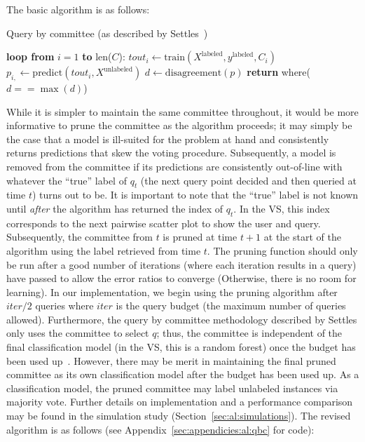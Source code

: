 The basic algorithm is as follows:

\tablespacing
\begin{algorithm}[H]
	\caption{Query by committee (as described by 
	Settles~\cite{settles2010})}\label{alg:al:methods:qbc1}
	\begin{algorithmic}[1]
		\State \textbf{loop from} $i=1$ \textbf{to} len($C$):
		\State \indent $\textit{tout}_{i} \gets 
		\text{train}(X^{\text{labeled}},y^{\text{labeled}},C_i)$
		\State \indent $p_{i,} \gets 
		\text{predict}(\textit{tout}_i,X^{\text{unlabeled}})$
		\State $d \gets \text{disagreement}(p)$
		\State \textbf{return} where($d==\max{(d)}$)
		\EndProcedure
	\end{algorithmic}
\end{algorithm}
\bodyspacing

\noindent While it is simpler to maintain the same committee 
throughout, it would be more informative to prune the committee as the 
algorithm proceeds; it may simply be the case that a model is ill-suited for 
the problem at hand and consistently returns predictions that skew the voting 
procedure. Subsequently, a model is removed from the committee if its 
predictions are consistently out-of-line with whatever the ``true'' label of 
$q_t$ (the next query point decided and then queried at time $t$) turns out to 
be. It is important to note that the ``true'' label is not known until 
\textit{after} the algorithm has returned the index of $q_t$. In the VS, this 
index corresponds to the next pairwise scatter plot to show the 
user and query. Subsequently, the committee from $t$ 
is pruned at time $t+1$ at the start of the algorithm using the label retrieved 
from time $t$. The pruning function should only 
be run after a good number of iterations (where each iteration results in a 
query) have passed to allow the error ratios to converge (Otherwise, there is 
no room for learning). In our implementation, we begin using the pruning 
algorithm after $iter/2$ queries where $iter$ is the query budget (the maximum 
number of queries allowed).
Furthermore, the query by committee methodology described by Settles only uses 
the committee to select $q$; thus, the committee is independent of the final 
classification model (in the VS, this is a random forest) once the budget has 
been used up~\cite{settles2010}. However, there may be merit in maintaining the 
final pruned committee as its own classification model after the budget has 
been used up. As a classification model, the pruned committee may label 
unlabeled instances via majority vote. Further details on implementation and a 
performance comparison may be found in the simulation study 
(Section~\ref{sec:al:simulations}). The revised algorithm is as follows (see 
Appendix~\ref{sec:appendicies:al:qbc} for code):


